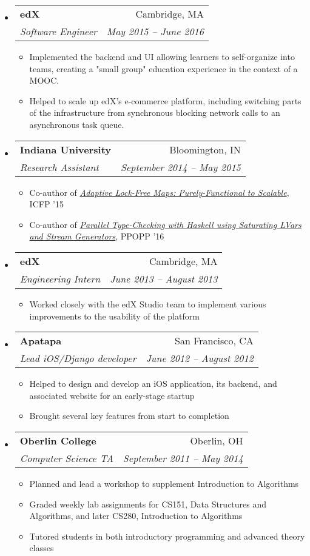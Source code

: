 \documentclass[letterpaper,11pt]{article}
\makeatletter
\newcommand{\resitem}[1]{\item #1 \vspace{-2pt}}
\newcommand{\ressubheading}[4]{
  \begin{tabular*}{6.5in}{l@{\extracolsep{\fill}}r}
    \textbf{#1} & #2 \\
    \textit{#3} & \textit{#4} \\
  \end{tabular*}\vspace{-6pt}}
\makeatother
\begin{document}
\begin{itemize}
\item
  \ressubheading{edX}{Cambridge, MA}{Software Engineer}{May 2015 -- June 2016}
  \begin{itemize}
    \resitem{Implemented the backend and UI allowing learners to self-organize into teams, creating a "small group" education experience in the context of a MOOC.}
    \resitem{Helped to scale up edX's e-commerce platform, including switching parts of the infrastructure from synchronous blocking network calls to an asynchronous task queue.}
  \end{itemize}
\item
  \ressubheading{Indiana University}{Bloomington, IN}{Research Assistant}{September 2014 -- May 2015}
  \begin{itemize}
  \resitem{Co-author of \href{http://www.cs.indiana.edu/~rrnewton/papers/icfp15_adaptive_data.pdf}{\textit{Adaptive Lock-Free Maps: Purely-Functional to Scalable}}, ICFP '15}
  \resitem{Co-author of \href{https://dl.acm.org/citation.cfm?id=2851142}{\textit{Parallel Type-Checking with Haskell using Saturating LVars and Stream Generators}}, PPOPP '16}
  \end{itemize}
\item
  \ressubheading{edX}{Cambridge, MA}{Engineering Intern}{June 2013 -- August 2013}
  \begin{itemize}
  \resitem{Worked closely with the edX Studio team to implement various improvements to the usability of the platform}
  \end{itemize}
\item
  \ressubheading{Apatapa}{San Francisco, CA}{Lead iOS/Django developer}{June 2012 -- August 2012}
  \begin{itemize}
    \resitem{Helped to design and develop an iOS application, its backend, and associated website for an early-stage startup}
    \resitem{Brought several key features from start to completion}
  \end{itemize}
\item
  \ressubheading{Oberlin College}{Oberlin, OH}{Computer Science TA}{September 2011 -- May 2014}
  \begin{itemize}
    \resitem{Planned and lead a workshop to supplement Introduction to Algorithms}
    \resitem{Graded weekly lab assignments for CS151, Data Structures and Algorithms, and later CS280, Introduction to Algorithms}
    \resitem{Tutored students in both introductory programming and advanced theory classes}
  \end{itemize}
\end{itemize}
\end{document}
